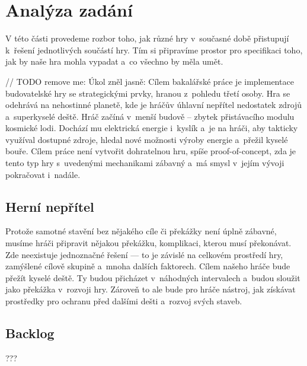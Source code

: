 
\chapter{Analýza zadání}

V této části provedeme rozbor toho, jak různé hry v~současné době přistupují k~řešení jednotlivých součástí hry. Tím si připravíme prostor pro specifikaci toho, jak by naše hra mohla vypadat a~co všechno by měla umět.

// TODO remove me:
Úkol zněl jasně: Cílem bakalářské práce je implementace budovatelské hry se strategickými prvky, hranou z~pohledu třetí osoby. Hra se odehrává na nehostinné planetě, kde je hráčův úhlavní nepřítel nedostatek zdrojů a~superkyselé deště. Hráč začíná v~menší budově – zbytek přistávacího modulu kosmické lodi. Dochází mu elektrická energie i~kyslík a~je na hráči, aby takticky využíval dostupné zdroje, hledal nové možnosti výroby energie a~přežil kyselé bouře. Cílem práce není vytvořit dohratelnou hru, spíše proof-of-concept, zda je tento typ hry s~uvedenými mechanikami zábavný a~má smysl v~jejím vývoji pokračovat i~nadále.








\section{Herní nepřítel}
Protože samotné stavění bez nějakého cíle či překážky není úplně zábavné, musíme hráči připravit nějakou překážku, komplikaci, kterou musí překonávat. Zde neexistuje jednoznačné řešení --- to je závislé na celkovém prostředí hry, zamýšlené cílově skupině a~mnoha dalších faktorech. Cílem našeho hráče bude přežít kyselé deště. Ty budou přicházet v~náhodných intervalech a~budou sloužit jako překážka v~rozvoji hry. Zároveň to ale bude pro hráče nástroj, jak získávat prostředky pro ochranu před dalšími dešti a~rozvoj svých staveb. 

\section{Backlog}


???



